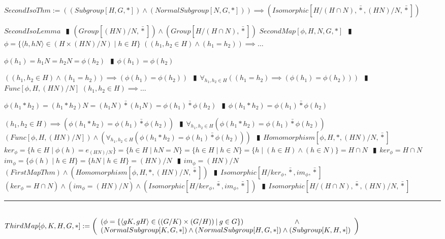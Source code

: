 \documentclass{book}
\newcommand{\abr}{:=}
\newcommand{\pipe}{$\phantom{(}\vrectangleblack\phantom{)}$}
\newcommand{\bbin}[1]{\mathbin{{\bar{#1}}}}
\newcommand{\st}{\mathbin{|}}
\begin{document}
$SecondIsoThm \abr ((Subgroup[H, G, *]) \land (NormalSubgroup[N, G, *])) \implies (Isomorphic[H / (H \cap N), \bbin{*}, (H N) / N, \bbin{*}])$
\begin{enumerate}
  \lit $SecondIsoLemma$ \pipe $(Group[(H N) / N, \bbin{*}]) \land (Group[H / (H \cap N), \bbin{*}])$
  \lit $SecondMap[\phi, H, N, G, *]$ \pipe $\phi = \{\langle h, h N \rangle \in (H \times (H N) / N) \st h \in H\}$
  \lit $((h_1, h_2 \in H) \land (h_1 = h_2)) \implies \ldots$
  \begin{enumerate}
    \lit $\phi(h_1) = h_1 N = h_2 N = \phi(h_2)$ \pipe $\phi(h_1) = \phi(h_2)$
  \end{enumerate}
  \lit $((h_1, h_2 \in H) \land (h_1 = h_2)) \implies (\phi(h_1) = \phi(h_2))$ \pipe $\forall_{h_1, h_2 \in H}((h_1 = h_2) \implies (\phi(h_1) = \phi(h_2)))$ \pipe $Func[\phi, H, (H N) / N]$
  \lit $(h_1, h_2 \in H) \implies \ldots$
  \begin{enumerate}
    \lit $\phi(h_1 * h_2) = (h_1 * h_2) N = (h_1 N) \bbin{*} (h_1 N) = \phi(h_1) \bbin{*} \phi(h_2)$ \pipe $\phi(h_1 * h_2) = \phi(h_1) \bbin{*} \phi(h_2)$  %
  \end{enumerate}
  \lit $(h_1, h_2 \in H) \implies (\phi(h_1 * h_2) = \phi(h_1) \bbin{*} \phi(h_2))$ \pipe $\forall_{h_1, h_2 \in H}(\phi(h_1 * h_2) = \phi(h_1) \bbin{*} \phi(h_2))$
  \lit $(Func[\phi, H, (H N) / N]) \land (\forall_{h_1, h_2 \in H}(\phi(h_1 * h_2) = \phi(h_1) \bbin{*} \phi(h_2)))$ \pipe $Homomorphism[\phi, H, *, (H N) / N, \bbin{*}]$
  \lit $ker_\phi = \{h \in H \st \phi(h) = e_{(H N) / N}\} = \{h \in H \st h N = N\} = \{h \in H \st h \in N\} = \{h \st (h \in H) \land (h \in N)\} = H \cap N$ \pipe $ker_\phi = H \cap N$
  \lit $im_\phi = \{\phi(h) \st h \in H\} = \{h N \st h \in H\} = (H N) / N$ \pipe $im_\phi = (H N) / N$
  \lit $(FirstMapThm) \land (Homomorphism[\phi, H, *, (H N) / N, \bbin{*}])$ \pipe $Isomorphic[H / ker_\phi, \bbin{*}, im_\phi, \bbin{*}]$
  \lit $(ker_\phi = H \cap N) \land (im_\phi = (H N) / N) \land (Isomorphic[H / ker_\phi, \bbin{*}, im_\phi, \bbin{*}])$ \pipe $Isomorphic[H / (H \cap N), \bbin{*}, (H N) / N, \bbin{*}]$
\end{enumerate} \vspace{.75mm} \hrule \vspace{.75mm} \ \\ 

$ThirdMap[\phi, K, H, G, *] \abr \left(\begin{array}{ll}
  (\phi = \{\langle g K, g H \rangle \in ((G / K) \times (G / H)) \st g \in G\}) \hfill \land \hfill \\
  (NormalSubgroup[K, G, *]) \hfill \land \hfill (NormalSubgroup[H, G, *]) \hfill \land \hfill (Subgroup[K, H, *])
\end{array}\right)$ \\
\end{document}
